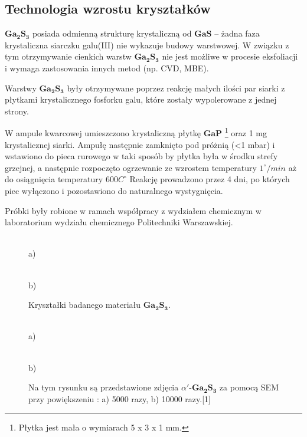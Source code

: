 \subsection{Technologia wzrostu kryształków} 

$\mathbf{Ga_{2}S_{3}}$ posiada odmienną strukturę krystaliczną od $\mathbf{GaS}$ – żadna faza krystaliczna siarczku galu(III) nie wykazuje budowy warstwowej. W związku z tym otrzymywanie cienkich warstw $\mathbf{Ga_{2}S_{3}}$ nie jest możliwe w procesie eksfoliacji i wymaga zastosowania innych metod (np. CVD, MBE).

Warstwy $\mathbf{Ga_{2}S_{3}}$ były otrzymywane poprzez reakcję małych ilości par siarki z płytkami krystalicznego fosforku galu, które zostały wypolerowane z jednej strony.

W ampule kwarcowej umieszczono krystaliczną płytkę $\mathbf{GaP}$ \footnote{Płytka jest mała o wymiarach 5 x 3 x 1 mm.} oraz 1 mg krystalicznej siarki. Ampułę następnie zamknięto pod próżnią (<1 mbar) i wstawiono do pieca rurowego w taki sposób by płytka była w środku strefy grzejnej, a następnie rozpoczęto ogrzewanie ze wzrostem temperatury $1^{\circ}/min$ aż do osiągnięcia temperatury 600$C^{\circ}$
Reakcję prowadzono przez 4 dni, po których piec wyłączono i pozostawiono do naturalnego wystygnięcia.

Próbki były robione w ramach współpracy z wydziałem chemicznym w laboratorium wydziału chemicznego Politechniki Warszawskiej.

\begin{figure}[H]
	\begin{minipage}[h]{0.5\linewidth}
		 \\ a) 
	\end{minipage}
	\hfill
	\begin{minipage}[h]{0.5\linewidth}
		 \\b)
	\end{minipage}
	\caption{Kryształki badanego materiału $\mathbf{Ga_{2}S_{3}}$.}
\end{figure}

\begin{figure}[H]
	\begin{minipage}[h]{0.47\linewidth}
		 \\a) 
	\end{minipage}
	\hfill
	\begin{minipage}[h]{0.47\linewidth}
		 \\b)
	\end{minipage}
	\caption{Na tym rysunku są przedstawione zdjęcia $\alpha'$-$\mathbf{Ga_{2}S_{3}}$ za pomocą SEM przy powiększeniu : a) 5000 razy, b) 10000 razy.[1]}
\end{figure}

